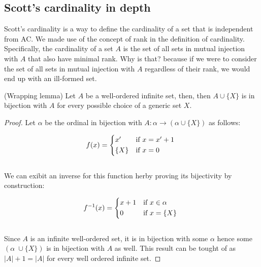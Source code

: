 \subsection{Scott's cardinality in depth}
Scott's cardinality is a way to define the cardinality of a set that is independent from 
AC. We made use of the concept of rank in the definition of
cardinality. Specifically, the cardinality of a set $A$ is the set of all sets in
mutual injection with $A$ that also have minimal rank. Why is that? because if we 
were to consider the set of all sets in mutual injection with $A$ regardless of their rank, 
we would end up with an ill-formed set.

\begin{lemma}(Wrapping lemma)
    Let $A$ be a well-ordered infinite set, then, then $A \cup \{ X \}$ is 
    in bijection with $A$ for every possible choice of a generic set $X$.
\end{lemma}
\begin{proof}
    Let $\alpha$ be the ordinal in bijection with $A : \alpha \rightarrow (\alpha \cup \{X\})$ as follows:

    \begin{equation*}
        f(x) = 
        \begin{cases*}
            x'     & \text{if} \( x = x' + 1 \) \\
            \{X\}  & \text{if} \( x = 0 \)      \\
        \end{cases*}
    \end{equation*}                             \\

    We can exibit an inverse for this function herby proving its bijectivity by construction:

    \begin{equation*}
        f^{-1}(x) = 
        \begin{cases*}
            x + 1      & \text{if} \( x \in \alpha \) \\
            0          & \text{if} \( x = \{X\} \)    \\
        \end{cases*}
    \end{equation*}                                   \\

    Since $A$ is an infinite well-ordered set, it is in bijection with some $\alpha$ hence some $(\alpha \;\cup \{X\})$ is in 
    bijection with $A$ as well. This result can be tought of as $|A| + 1 = |A|$ for every well ordered infinite set.
    

\end{proof}

